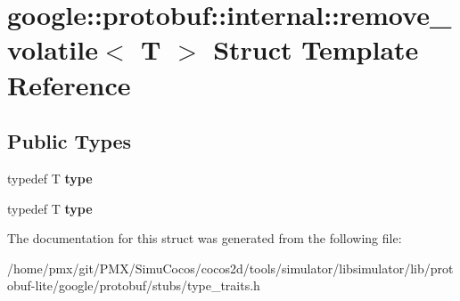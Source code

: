 \hypertarget{structgoogle_1_1protobuf_1_1internal_1_1remove__volatile}{}\section{google\+:\+:protobuf\+:\+:internal\+:\+:remove\+\_\+volatile$<$ T $>$ Struct Template Reference}
\label{structgoogle_1_1protobuf_1_1internal_1_1remove__volatile}
\subsection*{Public Types}
\begin{DoxyCompactItemize}
\item 
\mbox{\label{structgoogle_1_1protobuf_1_1internal_1_1remove__volatile_a111bd85f110bc209012b7541b911cbdd}} 
typedef T {\bfseries type}
\item 
\mbox{\label{structgoogle_1_1protobuf_1_1internal_1_1remove__volatile_a111bd85f110bc209012b7541b911cbdd}} 
typedef T {\bfseries type}
\end{DoxyCompactItemize}


The documentation for this struct was generated from the following file\+:\begin{DoxyCompactItemize}
\item 
/home/pmx/git/\+P\+M\+X/\+Simu\+Cocos/cocos2d/tools/simulator/libsimulator/lib/protobuf-\/lite/google/protobuf/stubs/type\+\_\+traits.\+h\end{DoxyCompactItemize}
